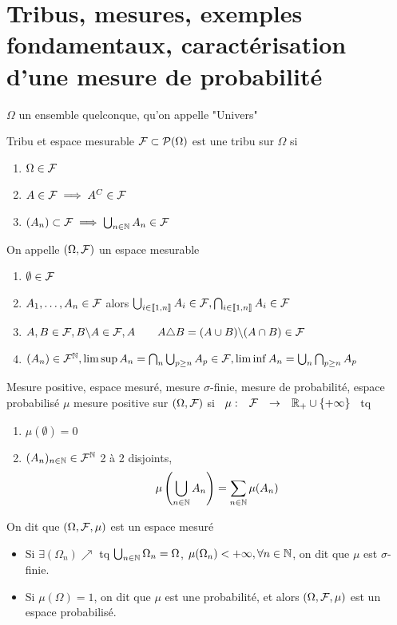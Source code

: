 \documentclass[]{report}
\begin{document}
\section{Tribus, mesures, exemples fondamentaux, caractérisation d'une mesure de probabilité}

$\Omega$ un ensemble quelconque, qu'on appelle "Univers"

\begin{df}{Tribu et espace mesurable}{}
    $\mathcal{F}\subset \mathcal{P}(\Omega)$ est une tribu sur $\Omega$ si
    \begin{enumerate}[label=\roman*]
        \item $\Omega\in \mathcal{F}$
        \item $A\in \mathcal{F}\implies A^C\in \mathcal{F}$
        \item $(A_n)\subset \mathcal{F}\implies \bigcup_{{n\in\mathbb{N}}} A_n\in \mathcal{F}$
    \end{enumerate}
    On appelle $(\Omega,\mathcal{F})$ un espace mesurable
\end{df}

\begin{prop}{}{}
    \begin{enumerate}[label=\alph*]
        \item $\emptyset\in \mathcal{F}$
        \item $A_1,\ldots,A_n\in \mathcal{F}$ alors $\bigcup_{i\in \llbracket 1,n\rrbracket} A_i \in \mathcal{F}, \bigcap_{i\in \llbracket 1,n \rrbracket} A_i \in \mathcal{F}$
        \item $A,B\in \mathcal{F}, B\backslash A\in \mathcal{F}, A \qquad A\triangle B=(A\cup B)\backslash (A\cap B)\in \mathcal{F}$
        \item $(A_n)\in \mathcal{F}^{\mathbb{N}},\limsup A_n=\bigcap_n \bigcup_{p\ge n}A_p\in \mathcal{F},\liminf A_n=\bigcup_n \bigcap_{p\ge n} A_p$
    \end{enumerate}
\end{prop}

\begin{df}{Mesure positive, espace mesuré, mesure $\sigma$-finie, mesure de probabilité, espace probabilisé}{}
    $\mu$ mesure positive sur $(\Omega,\mathcal{F})$ si $\begin{array}{ccccc} \mu : &  \mathcal{F} & \to & \mathbb{R}_+ \cup \{+\infty\} \end{array}$ tq
    \begin{enumerate}[label=\roman*]
        \item $\mu (\emptyset)=0$
        \item $(A_n)_{n\in\mathbb{N}}\in \mathcal{F}^{\mathbb{N}}$ 2 à 2 disjoints,
        \[ \mu \left( \bigcup_{n\in\mathbb{N}} A_n \right)=\sum_{n\in\mathbb{N}} \mu(A_n)\]
    \end{enumerate}
    On dit que $(\Omega,\mathcal{F},\mu)$ est un espace mesuré
    \begin{itemize}
        \item Si $\exists (\Omega_n)\nearrow$ tq $\bigcup_{n\in\mathbb{N}} \Omega_n=\Omega$, $\mu(\Omega_n)<+\infty,\forall n\in \mathbb{N}$, on dit que $\mu $ est $\sigma$-finie.
        \item Si $\mu(\Omega)=1$, on dit que $\mu$ est une probabilité, et alors $(\Omega,\mathcal{F},\mu)$ est un espace probabilisé.
    \end{itemize}
\end{df}
\end{document}
